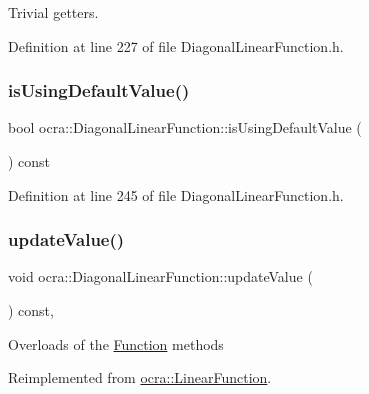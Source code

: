 Trivial getters. 

Definition at line 227 of file Diagonal\+Linear\+Function.\+h.

\hypertarget{classocra_1_1DiagonalLinearFunction_a8cca25ae530e9af992acf44e3b95da2a}{}\label{classocra_1_1DiagonalLinearFunction_a8cca25ae530e9af992acf44e3b95da2a} 
\subsubsection{\texorpdfstring{is\+Using\+Default\+Value()}{isUsingDefaultValue()}}
{\footnotesize\ttfamily bool ocra\+::\+Diagonal\+Linear\+Function\+::is\+Using\+Default\+Value (\begin{DoxyParamCaption}{ }\end{DoxyParamCaption}) const\hspace{0.3cm}{\ttfamily [inline]}}



Definition at line 245 of file Diagonal\+Linear\+Function.\+h.

\hypertarget{classocra_1_1DiagonalLinearFunction_a69523347749429dae6ae041326e40d43}{}\label{classocra_1_1DiagonalLinearFunction_a69523347749429dae6ae041326e40d43} 
\subsubsection{\texorpdfstring{update\+Value()}{updateValue()}}
{\footnotesize\ttfamily void ocra\+::\+Diagonal\+Linear\+Function\+::update\+Value (\begin{DoxyParamCaption}{ }\end{DoxyParamCaption}) const\hspace{0.3cm}{\ttfamily [protected]}, {\ttfamily [virtual]}}

Overloads of the \hyperlink{classocra_1_1Function}{Function} methods 

Reimplemented from \hyperlink{classocra_1_1LinearFunction_a1b9fd7a03a8630055c117d19e0ff019a}{ocra\+::\+Linear\+Function}.



